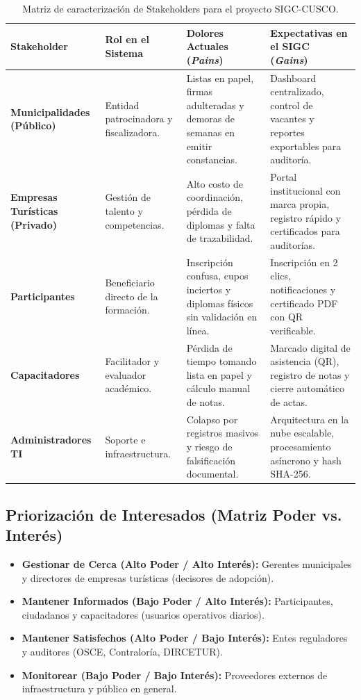 \begin{table}[H]
\centering
\small
\renewcommand{\arraystretch}{1.2}
\begin{tabularx}{\textwidth}{P{2.8cm}P{3.0cm}P{4.2cm}Y}
\toprule
\textbf{Stakeholder} & \textbf{Rol en el Sistema} & \textbf{Dolores Actuales (\textit{Pains})} & \textbf{Expectativas en el SIGC (\textit{Gains})} \\
\midrule
\textbf{Municipalidades (Público)} & Entidad patrocinadora y fiscalizadora. & Listas en papel, firmas adulteradas y demoras de semanas en emitir constancias. & Dashboard centralizado, control de vacantes y reportes exportables para auditoría. \\
\midrule
\textbf{Empresas Turísticas (Privado)} & Gestión de talento y competencias. & Alto costo de coordinación, pérdida de diplomas y falta de trazabilidad. & Portal institucional con marca propia, registro rápido y certificados para auditorías. \\
\midrule
\textbf{Participantes} & Beneficiario directo de la formación. & Inscripción confusa, cupos inciertos y diplomas físicos sin validación en línea. & Inscripción en 2 clics, notificaciones y certificado PDF con QR verificable. \\
\midrule
\textbf{Capacitadores} & Facilitador y evaluador académico. & Pérdida de tiempo tomando lista en papel y cálculo manual de notas. & Marcado digital de asistencia (QR), registro de notas y cierre automático de actas. \\
\midrule
\textbf{Administradores TI} & Soporte e infraestructura. & Colapso por registros masivos y riesgo de falsificación documental. & Arquitectura en la nube escalable, procesamiento asíncrono y hash SHA-256. \\
\bottomrule
\end{tabularx}
\caption{Matriz de caracterización de Stakeholders para el proyecto SIGC-CUSCO.}
\label{tab:stakeholders}
\end{table}

\subsection{Priorización de Interesados (Matriz Poder vs. Interés)}
\begin{itemize}
    \item \textbf{Gestionar de Cerca (Alto Poder / Alto Interés):} Gerentes municipales y directores de empresas turísticas (decisores de adopción).
    \item \textbf{Mantener Informados (Bajo Poder / Alto Interés):} Participantes, ciudadanos y capacitadores (usuarios operativos diarios).
    \item \textbf{Mantener Satisfechos (Alto Poder / Bajo Interés):} Entes reguladores y auditores (OSCE, Contraloría, DIRCETUR).
    \item \textbf{Monitorear (Bajo Poder / Bajo Interés):} Proveedores externos de infraestructura y público en general.
\end{itemize}
